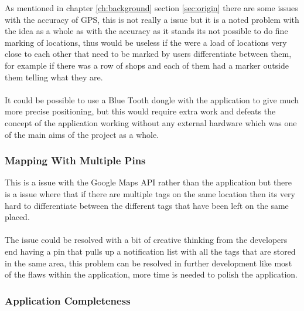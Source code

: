 As mentioned in chapter \ref{ch:background} section \ref{sec:origin} there are some issues with the accuracy of GPS, this is not really a issue but it is a noted problem with the idea as a whole as with the accuracy as it stands its not possible to do fine marking of locations, thus would be useless if the were a load of locations very close to each other that need to be marked by users differentiate between them, for example if there was a row of shops and each of them had a marker outside them telling what they are.\\
\\
It could be possible to use a Blue Tooth dongle with the application to give much more precise positioning, but this would require extra work and defeats the concept of the application working without any external hardware which was one of the main aims of the project as a whole.

\subsubsection{Mapping With Multiple Pins}

This is a issue with the Google Maps API rather than the application but there is a issue where that if there are multiple tags on the same location then its very hard to differentiate between the different tags that have been left on the same placed.\\
\\
The issue could be resolved with a bit of creative thinking from the developers end having a pin that pulls up a notification list with all the tags that are stored in the same area, this problem can be resolved in further development like most of the flaws within the application, more time is needed to polish the application.

\subsubsection{Application Completeness}

